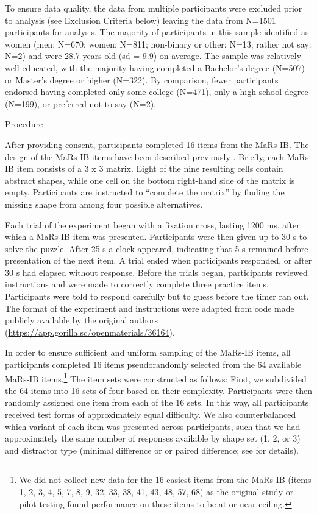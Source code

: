 \documentclass[a4paper,man,natbib]{apa6}
\makeatletter
\renewcommand{\subsubsection}{\@startsection{subsubsection}{3}
  {\z@}%
  {\b@level@two@skip}{\e@level@two@skip}%
  {\normalfont\normalsize\bfseries}}
\makeatother
\begin{document}
To ensure data quality, the data from multiple participants were excluded prior to analysis (see Exclusion Criteria below) leaving the data from N=1501 participants for analysis. The majority of participants in this sample identified as women (men: N=670; women: N=811; non-binary or other: N=13; rather not say: N=2) and were 28.7 years old (sd = 9.9) on average. The sample was relatively well-educated, with the majority having completed a Bachelor's degree (N=507) or Master's degree or higher (N=322). By comparison, fewer participants endorsed having completed only some college (N=471), only a high school degree (N=199), or preferred not to say (N=2). 

\subsubsection{Procedure}

After providing consent, participants completed 16 items from the MaRs-IB. The design of the MaRs-IB items have been described previously \citep{chierchia2019matrix}. Briefly, each MaRs-IB item consists of a 3 x 3 matrix. Eight of the nine resulting cells contain abstract shapes, while one cell on the bottom right-hand side of the matrix is empty. Participants are instructed to ``complete the matrix'' by finding the missing shape from among four possible alternatives. 

Each trial of the experiment began with a fixation cross, lasting  1200 ms, after which a MaRs-IB item was presented. Participants were then given up to 30 s to solve the puzzle. After 25 s a clock appeared, indicating that 5 s remained before presentation of the next item. A trial ended when participants responded, or after 30 s had elapsed without response. Before the trials began, participants reviewed instructions and were made to correctly complete three practice items. Participants were told to respond carefully but to guess before the timer ran out. The format of the experiment and instructions were adapted from code made publicly available by the original authors (\url{https://app.gorilla.sc/openmaterials/36164}).

In order to ensure sufficient and uniform sampling of the MaRs-IB items, all participants completed 16 items pseudorandomly selected from the 64 available MaRs-IB items.\footnote{We did not collect new data for the 16 easiest items from the MaRs-IB (items 1, 2, 3, 4, 5, 7, 8, 9, 32, 33, 38, 41, 43, 48, 57, 68) as the original study or pilot testing found performance on these items to be at or near ceiling.} The item sets were constructed as follows: First, we subdivided the 64 items into 16 sets of four based on their complexity. Participants were then randomly assigned one item from each of the 16 sets. In this way, all participants received test forms of approximately equal difficulty. We also counterbalanced which variant of each item was presented across participants, such that we had approximately the same number of responses available by shape set (1, 2, or 3) and distractor type (minimal difference or or paired difference; see \cite{chierchia2019matrix} for details). 
\end{document}
